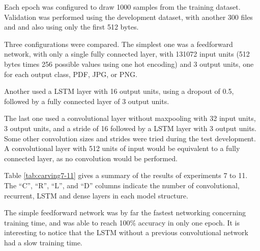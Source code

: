 Each epoch was configured to draw 1000 samples from the training dataset. Validation was performed using the development dataset, with another 300 files and and also using only the first 512 bytes.



Three configurations were compared. The simplest one was a feedforward network, with only a single fully connected layer, with 131072 input units (512 bytes times 256 possible values using one hot encoding) and 3 output units, one for each output class, PDF, JPG, or PNG.

Another used a LSTM layer with 16 output units, using a dropout of 0.5, followed by a fully connected layer of 3 output units.

The last one used a convolutional layer without maxpooling with 32 input units, 3 output units, and a stride of 16 followed by a LSTM layer with 3 output units. Some other convolution sizes and strides were tried during the test development. A convolutional layer with 512 units of input would be equivalent to a fully connected layer, as no convolution would be performed.

Table \ref{tab:carving7-11} gives a summary of the results of experiments 7 to 11. The ``C'', ``R'', ``L'', and ``D'' columns indicate the number of convolutional, recurrent, LSTM and dense layers in each model structure.


The simple feedforward network was by far the fastest networking concerning training time, and was able to reach 100\% accuracy in only one epoch. It is interesting to notice that the LSTM without a previous convolutional network had a slow training time.





% 


